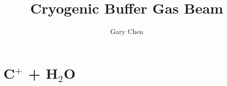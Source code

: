 \documentclass[a4paper]{report}
\title{Cryogenic Buffer Gas Beam}
\author{Gary Chen}
\begin{document}
\maketitle

% 
% 
% 
 
\tableofcontents

%
%
%

%

%
%
\chapter{C$^+$ + H$_2$O}

%
%



\end{document}
